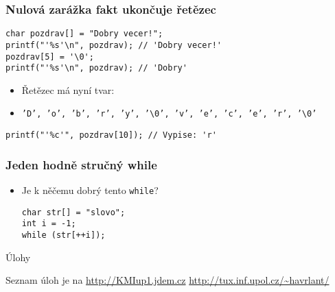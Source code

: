 \documentclass{beamer}
\newenvironment{itemizex}%
  {\large \begin{itemize}%
    \setlength{\itemsep}{8pt}%
    \setlength{\parskip}{8pt}}%
  {\end{itemize}}
\begin{document}
\begin{frame}[t,fragile]\frametitle{Nulová zarážka fakt ukončuje řetězec} 
    \begin{verbatim} 
char pozdrav[] = "Dobry vecer!";
printf("'%s'\n", pozdrav); // 'Dobry vecer!'
pozdrav[5] = '\0';
printf("'%s'\n", pozdrav); // 'Dobry'
    \end{verbatim}
    \begin{itemizex}
        \item Řetězec má nyní tvar:
        \item \texttt{'D', 'o', 'b', 'r', 'y', '\textbackslash0', 'v', 'e', 'c', 'e', 'r', '\textbackslash0'}
    \end{itemizex}
    \begin{verbatim} 
printf("'%c'", pozdrav[10]); // Vypise: 'r'
    \end{verbatim}
\end{frame}



\begin{frame}[t,fragile]\frametitle{Jeden hodně stručný while} 
    \begin{itemizex}
        \item Je k něčemu dobrý tento \texttt{while}?
        \begin{verbatim} 
char str[] = "slovo";
int i = -1;
while (str[++i]);
    \end{verbatim}
    \end{itemizex}
\end{frame}


\begin{frame}[t,fragile]{Úlohy}
\begin{center}
\vskip 1cm
{\Large Seznam úloh je na \url{http://KMIup1.jdem.cz}}
\vskip 2cm
\url{http://tux.inf.upol.cz/~havrlant/}
\end{center}
\end{frame}
\end{document}
